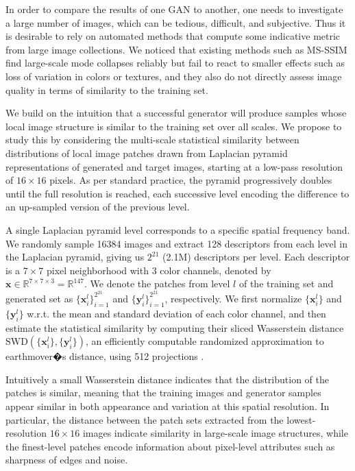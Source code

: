 \documentclass{article}
\begin{document}
In order to compare the results of one GAN to another, one needs to investigate a large number of images, which can be tedious, difficult, and subjective. Thus it is desirable to rely on automated methods that compute some indicative metric from large image collections. We noticed that existing methods such as MS-SSIM \citep{Odena2017} find large-scale mode collapses reliably but fail to react to smaller effects such as loss of variation in colors or textures, and they also do not directly assess image quality in terms of similarity to the training set.

We build on the intuition that a successful generator will produce samples whose {local image structure is similar to the training set over all scales}. We propose to study this by considering the multi-scale statistical similarity between distributions of local image patches drawn from Laplacian pyramid \citep{Burt1987} representations of generated and target images, starting at a low-pass resolution of $16\times 16$ pixels. As per standard practice, the pyramid progressively doubles until the full resolution is reached, each successive level encoding the difference to an up-sampled version of the previous level.

A single Laplacian pyramid level corresponds to a specific spatial frequency band. 
We randomly sample 16384 images and extract 128 descriptors from each level in the Laplacian pyramid, giving us $2^{21}$ (2.1M) descriptors per level. Each descriptor is a $7\times7$ pixel neighborhood with 3 color channels, denoted by $\boldsymbol{x}\in \mathbb{R}^{7\times 7\times 3}=\mathbb{R}^{147}$. We denote the patches from level $l$ of the training set and generated set as $\{\boldsymbol{x}^l_i\}_{i=1}^{2^{21}}$ and $\{\boldsymbol{y}^l_i\}_{i=1}^{2^{21}}$, respectively. We first normalize $\{\boldsymbol{x}^l_i\}$ and $\{\boldsymbol{y}^l_i\}$ w.r.t. the mean and standard deviation of each color channel, 
and then estimate the statistical similarity by computing their sliced Wasserstein distance $\mathrm{SWD}(\{\boldsymbol{x}^l_i\}, \{\boldsymbol{y}^l_i\})$, an efficiently computable randomized approximation to earthmover�s distance, using 512 projections \citep{Rabin2011}.

Intuitively a small Wasserstein distance indicates that the distribution of the patches is similar, meaning that the training images and generator samples appear {similar in both appearance and variation} at this spatial resolution. In particular, the distance between the patch sets extracted from the lowest-resolution $16\times 16$ images indicate similarity in large-scale image structures, while the finest-level patches encode information about pixel-level attributes such as sharpness of edges and noise. 
\end{document}
